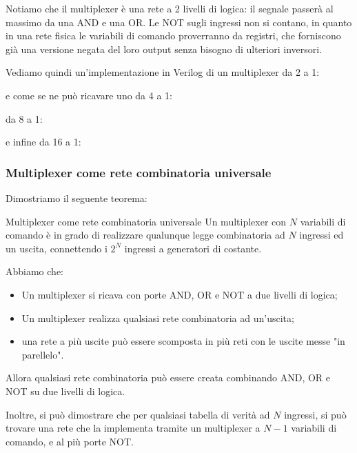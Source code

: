 \documentclass[a4paper,11pt]{article}
\begin{document}
Notiamo che il multiplexer è una rete a 2 livelli di logica: il segnale passerà al massimo da una AND e una OR.
Le NOT sugli ingressi non si contano, in quanto in una rete fisica le variabili di comando proverranno da registri, che forniscono già una versione negata del loro output senza bisogno di ulteriori inversori.

Vediamo quindi un'implementazione in Verilog di un multiplexer da 2 a 1:



e come se ne può ricavare uno da 4 a 1:



da 8 a 1:



e infine da 16 a 1:



\subsubsection{Multiplexer come rete combinatoria universale}
Dimostriamo il seguente teorema:
\begin{theorem}{Multiplexer come rete combinatoria universale}	
Un multiplexer con $N$ variabili di comando è in grado di realizzare qualunque legge combinatoria ad $N$ ingressi ed un uscita, connettendo i $2^N$ ingressi a generatori di costante.
\end{theorem}

Abbiamo che:
\begin{itemize}
	\item Un multiplexer si ricava con porte AND, OR e NOT a due livelli di logica; 
	\item Un multiplexer realizza qualsiasi rete combinatoria ad un'uscita;
	\item una rete a più uscite può essere scomposta in più reti con le uscite messe "in parellelo".
\end{itemize}
Allora qualsiasi rete combinatoria può essere creata combinando AND, OR e NOT su due livelli di logica.

Inoltre, si può dimostrare che per qualsiasi tabella di verità ad $N$ ingressi, si può trovare una rete che la implementa tramite un multiplexer a $N-1$ variabili di comando, e al più porte NOT.
\end{document}
